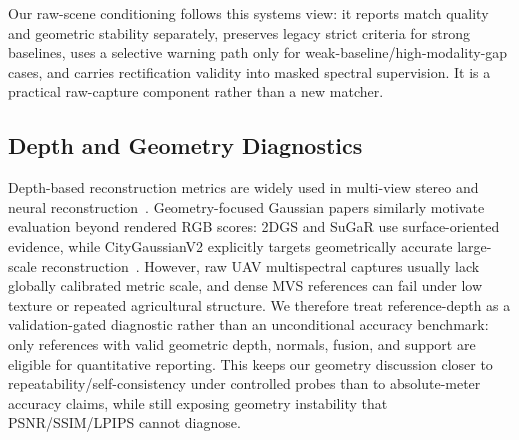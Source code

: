 Our raw-scene conditioning follows this systems view: it reports match quality and geometric stability separately, preserves legacy strict criteria for strong baselines, uses a selective warning path only for weak-baseline/high-modality-gap cases, and carries rectification validity into masked spectral supervision. It is a practical raw-capture component rather than a new matcher.

\subsection{Depth and Geometry Diagnostics}

Depth-based reconstruction metrics are widely used in multi-view stereo and neural reconstruction~\cite{yao2018mvsnet,gu2020casmvsnet,wang2021patchmatchnet}. Geometry-focused Gaussian papers similarly motivate evaluation beyond rendered RGB scores: 2DGS and SuGaR use surface-oriented evidence, while CityGaussianV2 explicitly targets geometrically accurate large-scale reconstruction~\cite{huang20242dgs,guedon2024sugar,liu2024citygaussianv2}. However, raw UAV multispectral captures usually lack globally calibrated metric scale, and dense MVS references can fail under low texture or repeated agricultural structure. We therefore treat reference-depth as a validation-gated diagnostic rather than an unconditional accuracy benchmark: only references with valid geometric depth, normals, fusion, and support are eligible for quantitative reporting. This keeps our geometry discussion closer to repeatability/self-consistency under controlled probes than to absolute-meter accuracy claims, while still exposing geometry instability that PSNR/SSIM/LPIPS cannot diagnose.

